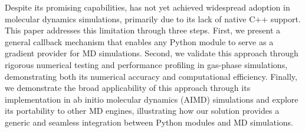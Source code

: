 Despite its promising capabilities,
\texttt{\torchcompile} has not yet achieved widespread adoption
in molecular dynamics simulations,
primarily due to its lack of native C++ support.
This paper addresses this limitation through three steps.
First, we present a general callback mechanism that enables any Python module
to serve as a gradient provider for MD simulations.
Second, we validate this approach through rigorous numerical testing and
performance profiling in gas-phase simulations,
demonstrating both its numerical accuracy and computational efficiency.
Finally, we demonstrate the broad applicability of this approach
through its implementation in ab initio molecular dynamics (AIMD) simulations
and explore its portability to other MD engines,
illustrating how our solution provides a generic and seamless integration
between Python modules and MD simulations.

